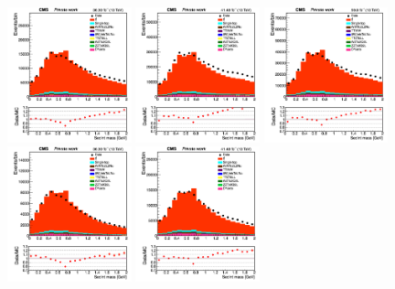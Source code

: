 \documentclass{cernatlasnote}
\begin{document}
   \begin{figure}[htp]
\centering
\includegraphics[width=0.32\textwidth]{images/emu_channel/2016/16_Range_0pt7_1pt3/SecInt_mass_Selec_Linear.png}
\includegraphics[width=0.32\textwidth]{images/emu_channel/2017/17_Range_0pt7_1pt3/SecInt_mass_Selec_Linear.png}
 \includegraphics[width=0.32\textwidth]{images/emu_channel/2018/18_Range_0pt7_1pt3/SecInt_mass_Selec_Linear.png}\\
 \includegraphics[width=0.32\textwidth]{images/emu_channel/2016/16_Range_0pt7_1pt3/SecInt_mass_TrackerMatched_Linear.png}
\includegraphics[width=0.32\textwidth]{images/emu_channel/2017/17_Range_0pt7_1pt3/SecInt_mass_TrackerMatched_Linear.png}

\end{figure}
\end{document}
